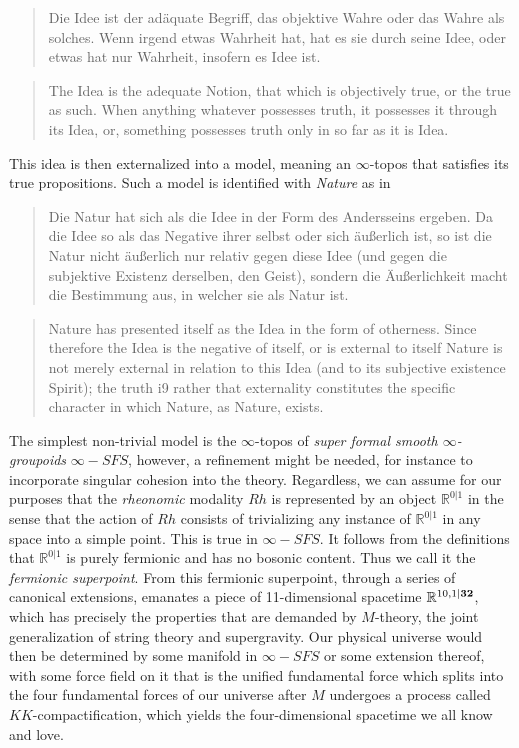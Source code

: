 \documentclass{article}
\begin{document}
\begin{quote}
    Die Idee ist der adäquate Begriff, das objektive Wahre oder das Wahre als solches. Wenn irgend etwas
Wahrheit hat, hat es sie durch seine Idee, oder etwas hat nur Wahrheit, insofern es Idee ist.
\end{quote}

\begin{quote}
    The Idea is the adequate Notion, that which is objectively true, or the true as such. When anything
whatever possesses truth, it possesses it through its Idea, or, something possesses truth only in so far
as it is Idea.
\end{quote}

This idea is then externalized into a model, meaning an $\infty$-topos that satisfies its true propositions.
Such a model is identified with \emph{Nature} as in 

\begin{quote}
    Die Natur hat sich als die Idee in der Form des Andersseins ergeben. Da die Idee so als das Negative
ihrer selbst oder sich äußerlich ist, so ist die Natur nicht äußerlich nur relativ gegen diese Idee (und
gegen die subjektive Existenz derselben, den Geist), sondern die Äußerlichkeit macht die Bestimmung aus,
in welcher sie als Natur ist.
\end{quote}

\begin{quote}
    Nature has presented itself as the Idea in the form of otherness. Since therefore the Idea is the
negative of itself, or is external to itself Nature is not merely external in relation to this Idea (and
to its subjective existence Spirit); the truth i9 rather that externality constitutes the specific character
in which Nature, as Nature, exists.
\end{quote}

The simplest non-trivial model is the $\infty$-topos of \emph{super formal smooth $\infty$-groupoids}
$\infty-SFS$, however, a refinement might be needed, for instance to incorporate singular cohesion into
the theory. Regardless, we can assume for our purposes that the \emph{rheonomic} modality $Rh$ is represented
by an object $\mathbb{R}^{0|1}$ in the sense that the action of $Rh$ consists of trivializing any instance
of  $\mathbb{R}^{0|1}$ in any space into a simple point. This is true in $\infty-SFS$. It follows from
the definitions that $\mathbb{R}^{0|1}$ is purely fermionic and has no bosonic content. Thus we call it
the \emph{fermionic superpoint}. From this fermionic superpoint, through a series of canonical extensions,
emanates a piece of 11-dimensional spacetime $\mathbb{R}^{10,1|\textrm{\textbf{32}}}$, which has precisely
the properties that are demanded by $M$-theory, the joint generalization of string theory and supergravity.
Our physical universe would then be determined by some manifold in $\infty-SFS$ or some extension thereof,
with some force field on it that is the unified fundamental force which splits into the four fundamental
forces of our universe after $M$ undergoes a process called $KK$-compactification, which yields the four-dimensional
spacetime we all know and love. \\
\end{document}
